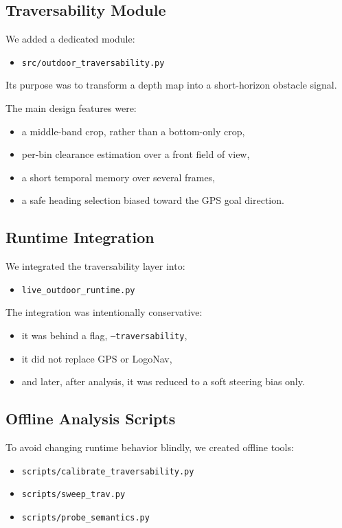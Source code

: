 \documentclass[11pt]{article}
\begin{document}
\subsection{Traversability Module}
We added a dedicated module:
\begin{itemize}[leftmargin=*]
\item \texttt{src/outdoor\_traversability.py}
\end{itemize}

Its purpose was to transform a depth map into a short-horizon obstacle signal.

The main design features were:
\begin{itemize}[leftmargin=*]
\item a middle-band crop, rather than a bottom-only crop,
\item per-bin clearance estimation over a front field of view,
\item a short temporal memory over several frames,
\item a safe heading selection biased toward the GPS goal direction.
\end{itemize}

\subsection{Runtime Integration}
We integrated the traversability layer into:
\begin{itemize}[leftmargin=*]
\item \texttt{live\_outdoor\_runtime.py}
\end{itemize}

The integration was intentionally conservative:
\begin{itemize}[leftmargin=*]
\item it was behind a flag, \texttt{--traversability},
\item it did not replace GPS or LogoNav,
\item and later, after analysis, it was reduced to a soft steering bias only.
\end{itemize}

\subsection{Offline Analysis Scripts}
To avoid changing runtime behavior blindly, we created offline tools:
\begin{itemize}[leftmargin=*]
\item \texttt{scripts/calibrate\_traversability.py}
\item \texttt{scripts/sweep\_trav.py}
\item \texttt{scripts/probe\_semantics.py}
\end{itemize}
\end{document}
